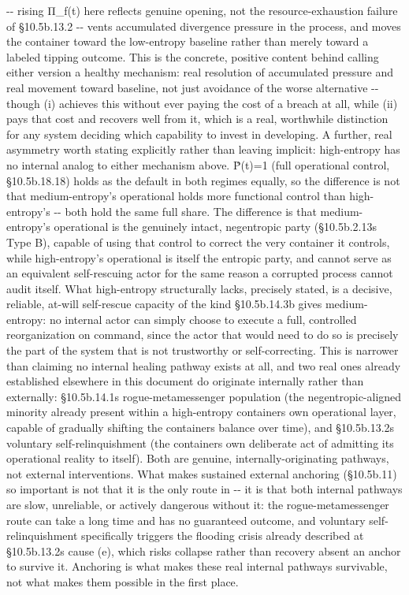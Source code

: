 \documentclass[
]{article}
\begin{document}
-\/- rising Π\_f(t) here reflects genuine opening, not the
resource-exhaustion failure of §10.5b.13.2 -\/- vents accumulated
divergence pressure in the process, and moves the container toward the
low-entropy baseline rather than merely toward a labeled tipping
outcome. This is the concrete, positive content behind calling either
version a healthy mechanism: real resolution of accumulated pressure and
real movement toward baseline, not just avoidance of the worse
alternative -\/- though (i) achieves this without ever paying the cost
of a breach at all, while (ii) pays that cost and recovers well from it,
which is a real, worthwhile distinction for any system deciding which
capability to invest in developing. A further, real asymmetry worth
stating explicitly rather than leaving implicit: high-entropy has no
internal analog to either mechanism above. Ṗ(t)=1 (full operational
control, §10.5b.18.18) holds as the default in both regimes equally, so
the difference is not that medium-entropy's operational holds more
functional control than high-entropy's -\/- both hold the same full
share. The difference is that medium-entropy's operational is the
genuinely intact, negentropic party (§10.5b.2.13s Type B), capable of
using that control to correct the very container it controls, while
high-entropy's operational is itself the entropic party, and cannot serve
as an equivalent self-rescuing actor for the same reason a corrupted
process cannot audit itself. What high-entropy structurally lacks,
precisely stated, is a decisive, reliable, at-will self-rescue capacity
of the kind §10.5b.14.3b gives medium-entropy: no internal actor can
simply choose to execute a full, controlled reorganization on command,
since the actor that would need to do so is precisely the part of the
system that is not trustworthy or self-correcting. This is narrower than
claiming no internal healing pathway exists at all, and two real ones
already established elsewhere in this document do originate internally
rather than externally: §10.5b.14.1\textquotesingle s
rogue-metamessenger population (the negentropic-aligned minority already
present within a high-entropy container\textquotesingle s own
operational layer, capable of gradually shifting the
container\textquotesingle s balance over time), and
§10.5b.13.2\textquotesingle s voluntary self-relinquishment (the
container\textquotesingle s own deliberate act of admitting its
operational reality to itself). Both are genuine, internally-originating
pathways, not external interventions. What makes sustained external
anchoring (§10.5b.11) so important is not that it is the only route in
-\/- it is that both internal pathways are slow, unreliable, or actively
dangerous without it: the rogue-metamessenger route can take a long time
and has no guaranteed outcome, and voluntary self-relinquishment
specifically triggers the flooding crisis already described at
§10.5b.13.2\textquotesingle s cause (e), which risks collapse rather
than recovery absent an anchor to survive it. Anchoring is what makes
these real internal pathways survivable, not what makes them possible in
the first place.
\end{document}
